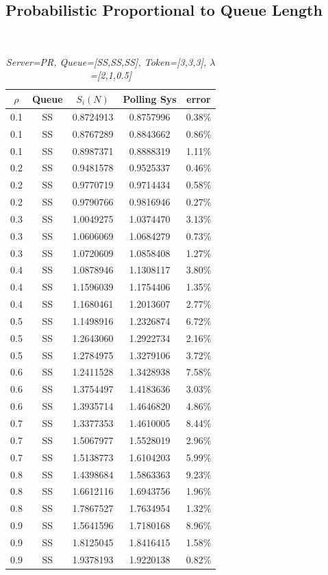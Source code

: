 \documentclass[12pt,a4paper,italian]{article}
\begin{document}
\subsection{Probabilistic Proportional to Queue Length}
\ \ \
\begin{table}[ht!]
	\begin{minipage}[b]{0.48\linewidth}\centering
		\centering
		\caption{\scriptsize \emph{Server=PR, Queue=[SS,SS,SS], Token=[3,3,3], $\lambda$=[2,1,0.5] }}
		\label{tab9}
		\tiny
		\begin{tabular}{c c c c c}
			\hline
			$\rho$ & Queue & $S_i(N)$ & Polling Sys & error \\ \hline
			0.1 & SS & 0.8724913 &   0.8757996    & 0.38\% \\
			0.1 & SS & 0.8767289 &   0.8843662    & 0.86\% \\
			0.1 & SS & 0.8987371 &   0.8888319    & 1.11\% \\ \hline \hline
			0.2 & SS & 0.9481578 &   0.9525337    & 0.46\% \\
			0.2 & SS & 0.9770719 &   0.9714434    & 0.58\% \\
			0.2 & SS & 0.9790766 &   0.9816946    & 0.27\% \\ \hline \hline
			0.3 & SS & 1.0049275 &   1.0374470    & 3.13\% \\
			0.3 & SS & 1.0606069 &   1.0684279    & 0.73\% \\
			0.3 & SS & 1.0720609 &   1.0858408    & 1.27\% \\ \hline \hline
			0.4 & SS & 1.0878946 &   1.1308117    & 3.80\% \\
			0.4 & SS & 1.1596039 &   1.1754406    & 1.35\% \\
			0.4 & SS & 1.1680461 &   1.2013607    & 2.77\% \\ \hline \hline
			0.5 & SS & 1.1498916 &   1.2326874    & 6.72\% \\
			0.5 & SS & 1.2643060 &   1.2922734    & 2.16\% \\
			0.5 & SS & 1.2784975 &   1.3279106    & 3.72\% \\ \hline \hline
			0.6 & SS & 1.2411528 &   1.3428938    & 7.58\% \\
			0.6 & SS & 1.3754497 &   1.4183636    & 3.03\% \\
			0.6 & SS & 1.3935714 &   1.4646820    & 4.86\% \\ \hline \hline
			0.7 & SS & 1.3377353 &   1.4610005    & 8.44\% \\
			0.7 & SS & 1.5067977 &   1.5528019    & 2.96\% \\
			0.7 & SS & 1.5138773 &   1.6104203    & 5.99\% \\ \hline \hline
			0.8 & SS & 1.4398684 &   1.5863363    & 9.23\% \\
			0.8 & SS & 1.6612116 &   1.6943756    & 1.96\% \\
			0.8 & SS & 1.7867527 &   1.7634954    & 1.32\% \\ \hline \hline
			0.9 & SS & 1.5641596 &   1.7180168    & 8.96\% \\
			0.9 & SS & 1.8125045 &   1.8416415    & 1.58\% \\
			0.9 & SS & 1.9378193 &   1.9220138    & 0.82\% \\\hline


\end{tabular}
\end{minipage}
\end{table}
\end{document}
